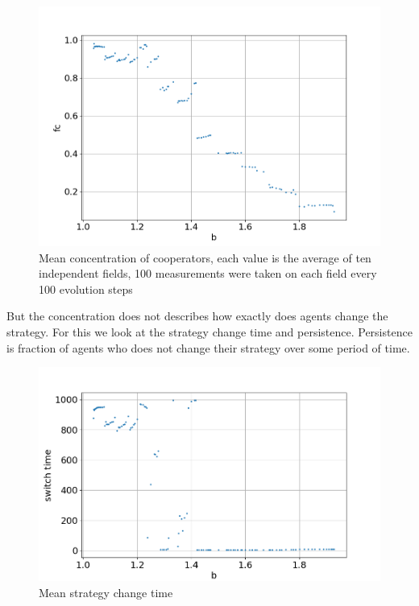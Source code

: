 \documentclass[a4paper,12pt]{article}
\begin{document}
\begin{figure}[H]
	\centering
	
	\includegraphics[width = \textwidth]{C_0.9_graph.png}
	\caption{Mean concentration of cooperators, each value is the average of ten independent fields, 100 measurements were taken on each field every 100 evolution steps	}
	\label{fig:Fc}

\end{figure}



But the concentration does not describes how exactly does agents change the strategy. For this we look at the strategy change time and persistence. Persistence is fraction of agents who does not change their strategy over some period of time. 

\begin{figure}[H]
	\includegraphics[width = \textwidth]{Change_time.png}
	\caption{Mean strategy change time}
	\label{fig:change time}
\end{figure}
\end{document}
